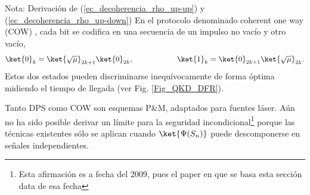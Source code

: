 \documentclass[a4paper,11pt]{book} %
\numberwithin{equation}{chapter}
\begin{document}
\begin{mybox_blue}{Nota: Derivación de (\ref{ec_decoherencia_rho_up-up}) y  (\ref{ec_decoherencia_rho_up-down})}
En el protocolo denominado coherent one way (COW) \cite{Phase_gisin2004practical,Phase_Stucki_2005}, cada bit se codifica en una secuencia de un impulso no vacío y otro vacío,
	\begin{equation}
	\ket{0}_k = \ket{\sqrt{\mu}}_{2k+1} \ket{0}_{2k}, \hspace{2cm} 
	\ket{1}_k = \ket{0}_{2k+1} \ket{\sqrt{\mu}}_{2k}.
	\end{equation}
Estos dos estados pueden discriminarse inequívocamente de forma óptima midiendo el tiempo de llegada (ver Fig. \ref{Fig_QKD_DFR}). 

Tanto DPS como COW son esquemas P\&M, adaptados para fuentes láser. Aún no ha sido posible derivar un límite para la seguridad incondicional\footnote{Esta afirmación es a fecha del 2009, pues el paper en que se basa esta sección \cite{QKD_resumen} data de esa fecha} porque las técnicas existentes sólo se aplican cuando $\ket{\Psi (S_n)}$ puede descomponerse en señales independientes. 
		
	
	
		
	
		
		
	

	





\end{mybox_blue}
\end{document}
